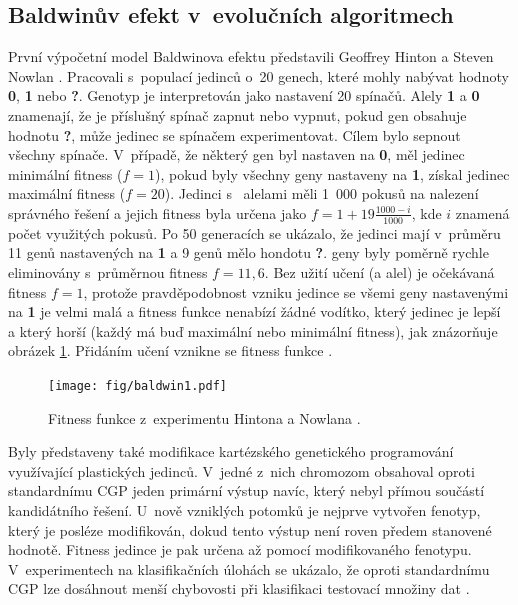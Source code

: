 \subsection{Baldwinův efekt v~evolučních algoritmech}

První výpočetní model Baldwinova efektu představili Geoffrey Hinton a Steven Nowlan \cite{HintonNowlan}. Pracovali s~populací jedinců o~20 genech, které mohly nabývat hodnoty \textbf{0}, \textbf{1} nebo \textbf{?}. Genotyp je interpretován jako nastavení 20 spínačů. Alely \textbf{1} a \textbf{0} znamenají, že je příslušný spínač zapnut nebo vypnut, pokud gen obsahuje hodnotu \textbf{?}, může jedinec se spínačem experimentovat. Cílem bylo sepnout všechny spínače. V~případě, že některý gen byl nastaven na \textbf{0}, měl jedinec minimální fitness ($f = 1$), pokud byly všechny geny nastaveny na \textbf{1}, získal jedinec maximální fitness ($f = 20$). Jedinci s~ alelami měli 1~000 pokusů na nalezení správného řešení a jejich fitness byla určena jako $f = 1 + 19 \frac{1000 - i}{1000}$, kde $i$ znamená počet využitých pokusů. Po 50 generacích se ukázalo, že jedinci mají v~průměru 11 genů nastavených na \textbf{1} a 9 genů mělo hondotu \textbf{?}.  geny byly poměrně rychle eliminovány s~průměrnou fitness $f = 11,6$. Bez užití učení (a  alel) je očekávaná fitness $f = 1$, protože pravděpodobnost vzniku jedince se všemi geny nastavenými na \textbf{1} je velmi malá a fitness funkce nenabízí žádné vodítko, který jedinec je lepší a který horší (každý má buď maximální nebo minimální fitness), jak znázorňuje obrázek \ref{obrHintonNowlan}. Přidáním učení vznikne se fitness funkce .

\begin{figure}[htb]
    \centering\texttt{[image: fig/baldwin1.pdf]}
    \caption{Fitness funkce z~experimentu Hintona a Nowlana \cite{HintonNowlan}.}
    \label{obrHintonNowlan}
\end{figure}

Byly představeny také modifikace kartézského genetického programování využívající plastických jedinců.
V~jedné z~nich chromozom obsahoval oproti standardnímu CGP jeden primární výstup navíc, který nebyl přímou součástí kandidátního řešení. U~nově vzniklých potomků je nejprve vytvořen fenotyp, který je posléze modifikován, dokud tento výstup není roven předem stanovené hodnotě. Fitness jedince je pak určena až pomocí modifikovaného fenotypu. V~experimentech na klasifikačních úlohách se ukázalo, že oproti standardnímu CGP lze dosáhnout menší chybovosti při klasifikaci testovací množiny dat \cite{UllahPlasticCGP}.

